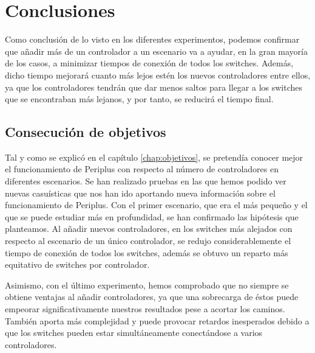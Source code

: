 \documentclass[a4paper, 12pt]{book}
\begin{document}
	
	
	\clearpage
	\chapter{Conclusiones}
	\label{chap:conclusiones}
	
	Como conclusión de lo visto en los diferentes experimentos, podemos confirmar que añadir más de un controlador a un escenario va a ayudar, en la gran mayoría de los casos, a minimizar tiempos de conexión de todos los switches. Además, dicho tiempo mejorará cuanto más lejos estén los nuevos controladores entre ellos, ya que los controladores tendrán que dar menos saltos para llegar a los switches que se encontraban más lejanos, y por tanto, se reducirá el tiempo final.  
	
	\section{Consecución de objetivos}
	\label{sec:consecucion-objetivos}
	
	Tal y como se explicó en el capítulo \ref{chap:objetivos}, se pretendía conocer mejor el funcionamiento de Periplus con respecto al número de controladores en diferentes escenarios. Se han realizado pruebas en las que hemos podido ver nuevas casuísticas que nos han ido aportando nueva información sobre el funcionamiento de Periplus. Con el primer escenario, que era el más pequeño y el que se puede estudiar más en profundidad, se han confirmado las hipótesis que planteamos. Al añadir nuevos controladores, en los switches más alejados con respecto al escenario de un único controlador, se redujo considerablemente el tiempo de conexión de todos los switches, además se obtuvo un reparto más equitativo de switches por controlador.
	
	Asimismo, con el último experimento, hemos comprobado que no siempre se obtiene ventajas al añadir controladores, ya que una sobrecarga de éstos puede empeorar significativamente nuestros resultados pese a acortar los caminos. También aporta más complejidad y puede provocar retardos inesperados debido a que los switches pueden estar simultáneamente conectándose a varios controladores.
	
\end{document}
